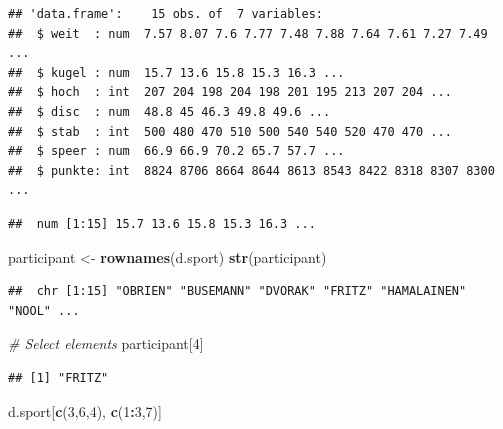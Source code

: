 \documentclass[
]{article}
\newenvironment{Shaded}{\begin{snugshade}}{\end{snugshade}}
\newcommand{\CommentTok}[1]{\textcolor[rgb]{0.56,0.35,0.01}{\textit{#1}}}
\newcommand{\DecValTok}[1]{\textcolor[rgb]{0.00,0.00,0.81}{#1}}
\newcommand{\FunctionTok}[1]{\textcolor[rgb]{0.13,0.29,0.53}{\textbf{#1}}}
\newcommand{\NormalTok}[1]{#1}
\newcommand{\OtherTok}[1]{\textcolor[rgb]{0.56,0.35,0.01}{#1}}
\newcommand{\SpecialCharTok}[1]{\textcolor[rgb]{0.81,0.36,0.00}{\textbf{#1}}}
\begin{document}
\begin{verbatim}
## 'data.frame':    15 obs. of  7 variables:
##  $ weit  : num  7.57 8.07 7.6 7.77 7.48 7.88 7.64 7.61 7.27 7.49 ...
##  $ kugel : num  15.7 13.6 15.8 15.3 16.3 ...
##  $ hoch  : int  207 204 198 204 198 201 195 213 207 204 ...
##  $ disc  : num  48.8 45 46.3 49.8 49.6 ...
##  $ stab  : int  500 480 470 510 500 540 540 520 470 470 ...
##  $ speer : num  66.9 66.9 70.2 65.7 57.7 ...
##  $ punkte: int  8824 8706 8664 8644 8613 8543 8422 8318 8307 8300 ...
\end{verbatim}

\begin{Shaded}
\end{Shaded}

\begin{verbatim}
##  num [1:15] 15.7 13.6 15.8 15.3 16.3 ...
\end{verbatim}

\begin{Shaded}
\begin{Highlighting}[]
\NormalTok{participant }\OtherTok{\textless{}{-}} \FunctionTok{rownames}\NormalTok{(d.sport)}
\FunctionTok{str}\NormalTok{(participant)}
\end{Highlighting}
\end{Shaded}

\begin{verbatim}
##  chr [1:15] "OBRIEN" "BUSEMANN" "DVORAK" "FRITZ" "HAMALAINEN" "NOOL" ...
\end{verbatim}

\begin{Shaded}
\begin{Highlighting}[]
\CommentTok{\# Select elements}
\NormalTok{participant[}\DecValTok{4}\NormalTok{]}
\end{Highlighting}
\end{Shaded}

\begin{verbatim}
## [1] "FRITZ"
\end{verbatim}

\begin{Shaded}
\begin{Highlighting}[]
\NormalTok{d.sport[}\FunctionTok{c}\NormalTok{(}\DecValTok{3}\NormalTok{,}\DecValTok{6}\NormalTok{,}\DecValTok{4}\NormalTok{), }\FunctionTok{c}\NormalTok{(}\DecValTok{1}\SpecialCharTok{:}\DecValTok{3}\NormalTok{,}\DecValTok{7}\NormalTok{)]}
\end{Highlighting}
\end{Shaded}
\end{document}
